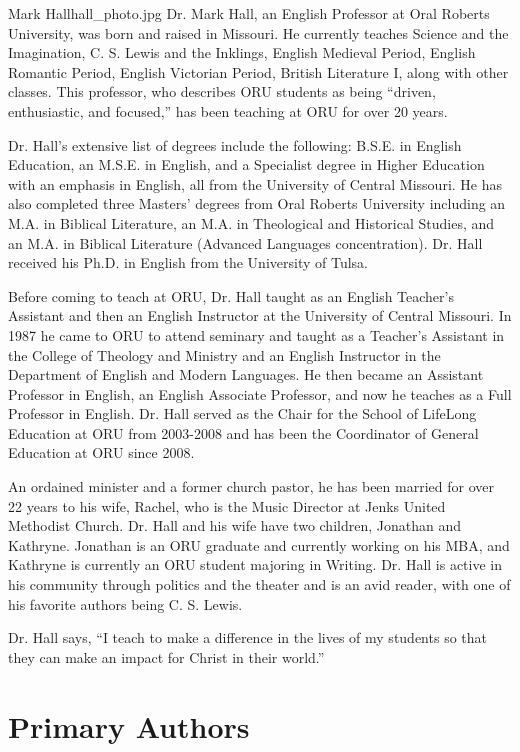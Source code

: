 \begin{authorbio}{Mark Hall}{hall_photo.jpg}
Dr. Mark Hall, an English Professor at Oral Roberts University, was born and raised in Missouri. He currently teaches Science and the Imagination, C. S. Lewis and the Inklings, English Medieval Period, English Romantic Period, English Victorian Period, British Literature I, along with other classes. This professor, who describes ORU students as being “driven, enthusiastic, and focused,” has been teaching at ORU for over 20 years.

Dr. Hall’s extensive list of degrees include the following: B.S.E. in English Education, an M.S.E. in English, and a Specialist degree in Higher Education with an emphasis in English, all from the University of Central Missouri.  He has also completed three Masters' degrees from Oral Roberts University including an M.A. in Biblical Literature, an M.A. in Theological and Historical Studies, and an M.A. in  Biblical Literature (Advanced Languages concentration).  Dr. Hall received his Ph.D. in English from the University of Tulsa.

Before coming to teach at ORU, Dr. Hall taught as an English Teacher’s Assistant and then an English Instructor at the University of Central Missouri.  In 1987 he came to ORU to attend seminary and taught as a Teacher’s Assistant in the College of Theology and Ministry and an English Instructor in the Department of English and Modern Languages.  He then became an Assistant Professor in English, an English Associate Professor, and now he teaches as a Full Professor in English.  Dr. Hall served as the Chair for the School of LifeLong Education at ORU from 2003-2008 and has been the Coordinator of General Education at ORU since 2008.

An ordained minister and a former church pastor, he has been married for over 22 years to his wife, Rachel, who is the Music Director at Jenks United Methodist Church. Dr. Hall and his wife have two children, Jonathan and Kathryne. Jonathan is an ORU graduate and currently working on his MBA, and Kathryne is currently an ORU student majoring in Writing.  Dr. Hall is active in his community through politics and the theater and is an avid reader, with one of his favorite authors being C. S. Lewis.

Dr. Hall says, “I teach to make a difference in the lives of my students so that they can make an impact for Christ in their world.”
\end{authorbio}

\section*{Primary Authors}

